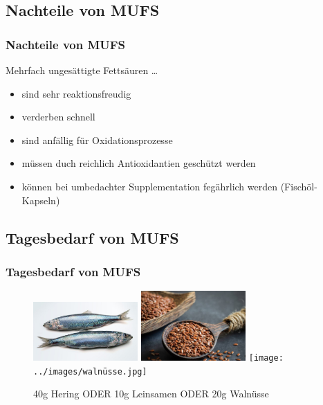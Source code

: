 \documentclass[xcolor=dvipsnames]{beamer}
\begin{document}
    \subsection{Nachteile von MUFS}
    \begin{frame}
        \frametitle{Nachteile von MUFS}

        \begin{block}{Mehrfach ungesättigte Fettsäuren \ldots}
            \begin{itemize}
                \setlength\itemsep{1em}
                \item sind sehr reaktionsfreudig
                \item verderben schnell
                \item sind anfällig für Oxidationsprozesse
                \item müssen duch reichlich Antioxidantien geschützt werden
                \item können bei umbedachter Supplementation fegährlich werden (Fischöl-Kapseln)
            \end{itemize}
        \end{block}
    \end{frame}

    \subsection{Tagesbedarf von MUFS}
    \begin{frame}
        \frametitle{Tagesbedarf von MUFS}

        \begin{figure}
            \centering
            \includegraphics[width=4cm]{../images/hering.jpg}
            \includegraphics[width=4cm]{../images/leinsamen.jpg}
            \texttt{[image: ../images/walnüsse.jpg]}
            \caption{40g Hering ODER 10g Leinsamen ODER 20g Walnüsse}
        \end{figure}
    \end{frame}
\end{document}
